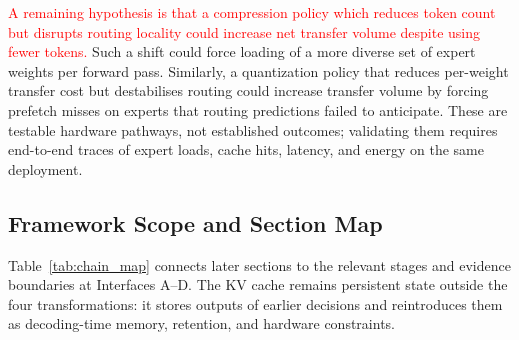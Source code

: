 \documentclass[10pt]{article}
\begin{document}
\textcolor{red}{A remaining hypothesis is that a compression policy which reduces token
count but disrupts routing locality could increase net transfer volume despite using
fewer tokens.}  Such a shift could force loading of a more diverse set of expert
weights per forward pass.
Similarly, a quantization policy that reduces per-weight
transfer cost but destabilises routing could increase transfer
volume by forcing prefetch misses on experts that routing
predictions failed to anticipate.
These are testable hardware pathways, not established outcomes; validating them
requires end-to-end traces of expert loads, cache hits, latency, and energy on the same
deployment.

\subsection{Framework Scope and Section Map}
\label{sec:chain_summary}

Table~\ref{tab:chain_map} connects later sections to the relevant stages and evidence
boundaries at Interfaces A--D.  The KV cache remains persistent state outside the four transformations:
it stores outputs of earlier decisions and reintroduces them as decoding-time memory,
retention, and hardware constraints.
\end{document}
